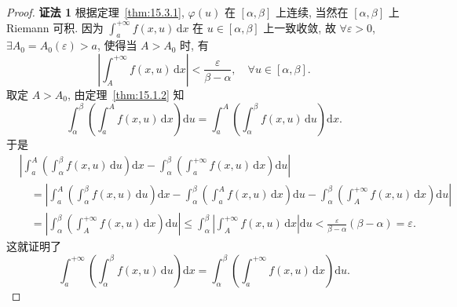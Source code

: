 \begin{proof}
\textbf{证法 1} 根据定理~\ref{thm:15.3.1}, $\varphi(u)$ 在 $[\alpha,\beta]$ 上连续, 当然在 $[\alpha,\beta]$ 上 Riemann 可积. 因为 $\displaystyle\int_{a}^{+\infty}f(x,u)\,\mathrm{d}x$ 在 $u\in[\alpha,\beta]$ 上一致收敛, 故 $\forall\varepsilon>0$, $\exists A_{0}=A_{0}(\varepsilon)>a$, 使得当 $A>A_{0}$ 时, 有
\[
  \left|\int_{A}^{+\infty}f(x,u)\,\mathrm{d}x\right|<\frac{\varepsilon}{\beta-\alpha},\quad\forall u\in[\alpha,\beta].
\]
取定 $A>A_{0}$, 由定理~\ref{thm:15.1.2} 知
\[
  \int_{\alpha}^{\beta}\left(\int_{a}^{A}f(x,u)\,\mathrm{d}x\right)\mathrm{d}u=\int_{a}^{A}\left(\int_{\alpha}^{\beta}f(x,u)\,\mathrm{d}u\right)\mathrm{d}x.
\]
于是
\[
  \begin{aligned}
    &\left|\int_{a}^{A}\left(\int_{\alpha}^{\beta}f(x,u)\,\mathrm{d}u\right)\mathrm{d}x-\int_{\alpha}^{\beta}\left(\int_{a}^{+\infty}f(x,u)\,\mathrm{d}x\right)\mathrm{d}u\right|\\
    &\quad=\left|\int_{a}^{A}\left(\int_{\alpha}^{\beta}f(x,u)\,\mathrm{d}u\right)\mathrm{d}x-\int_{\alpha}^{\beta}\left(\int_{a}^{A}f(x,u)\,\mathrm{d}x\right)\mathrm{d}u-\int_{\alpha}^{\beta}\left(\int_{A}^{+\infty}f(x,u)\,\mathrm{d}x\right)\mathrm{d}u\right|\\
    &\quad=\left|\int_{\alpha}^{\beta}\left(\int_{A}^{+\infty}f(x,u)\,\mathrm{d}x\right)\mathrm{d}u\right|\leqslant\int_{\alpha}^{\beta}\left|\int_{A}^{+\infty}f(x,u)\,\mathrm{d}x\right|\mathrm{d}u<\frac{\varepsilon}{\beta-\alpha}(\beta-\alpha)=\varepsilon.
  \end{aligned}
\]
这就证明了
\[
  \int_{a}^{+\infty}\left(\int_{\alpha}^{\beta}f(x,u)\,\mathrm{d}u\right)\mathrm{d}x=\int_{\alpha}^{\beta}\left(\int_{a}^{+\infty}f(x,u)\,\mathrm{d}x\right)\mathrm{d}u.
\]


\end{proof}
